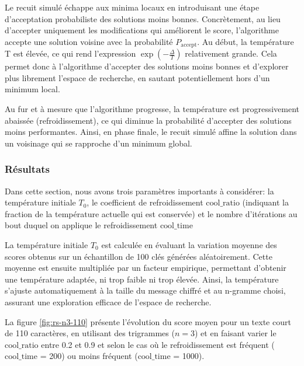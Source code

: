 \documentclass[a4paper]{article}
\begin{document}
Le recuit simulé échappe aux minima locaux en introduisant une étape d'acceptation probabiliste des solutions moins bonnes. Concrètement, au lieu d'accepter uniquement les modifications qui améliorent le score, l'algorithme accepte une solution voisine avec la probabilité $P_{\text{accept}}$.
Au début, la température T est élevée, ce qui rend l'expression $\exp\left(-\frac{\Delta}{T}\right)$ relativement grande. Cela permet donc à l'algorithme d'accepter des solutions moins bonnes et d'explorer plus librement l'espace de recherche, en sautant potentiellement hors d'un minimum local.

Au fur et à mesure que l'algorithme progresse, la température est progressivement abaissée (refroidissement), ce qui diminue la probabilité d'accepter des solutions moins performantes. Ainsi, en phase finale, le recuit simulé affine la solution dans un voisinage qui se rapproche d'un minimum global.


\subsubsection{Résultats}

Dans cette section, nous avons trois paramètres importants à considérer: la température initiale $T_0$, le coefficient de refroidissement \textit{\(\text{cool\_ratio}\)} (indiquant la fraction de la température actuelle qui est conservée) et le nombre d'itérations au bout duquel on applique le refroidissement \textbf{\(\text{cool\_time}\)}

La température initiale $T_0$ est calculée en évaluant la variation moyenne des scores obtenus sur un échantillon de 100 clés générées aléatoirement. Cette moyenne est ensuite multipliée par un facteur empirique, permettant d'obtenir une température adaptée, ni trop faible ni trop élevée. 
Ainsi, la température s'ajuste automatiquement à la taille du message chiffré et au n-gramme choisi, assurant une exploration efficace de l'espace de recherche.


La figure \ref{fig:rs-n3-110} présente l'évolution du score moyen pour un
texte court de 110 caractères, en utilisant des trigrammes ($n=3$) et en faisant varier le \textbf{\(\text{cool\_ratio}\)} entre 0.2 et 0.9 et selon le cas où le refroidissement est fréquent (\(\text{cool\_time}\) = 200) ou moins fréquent (\(\text{cool\_time}\) = 1000).
\end{document}
